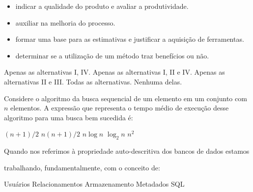 \documentclass[12pt, addpoints]{exam}
\begin{document}
\begin{questions}
\begin{itemize}

    \item[I)] indicar a qualidade do produto e avaliar a produtividade.

    \item[II)] auxiliar na melhoria do processo.

    \item[III)] formar uma base para as estimativas e justificar a aquisição de ferramentas.

    \item[IV)] determinar se a utilização de um método traz benefícios ou não.

\end{itemize}
\begin{choices}
\choice Apenas as alternativas I, IV.
\choice Apenas as alternativas I, II e IV.
\choice Apenas as alternativas II e III.
\choice Todas as alternativas.
\choice Nenhuma delas.
\end{choices}

\question

Considere o algoritmo da busca sequencial de um elemento em um conjunto com \( n \) elementos. A expressão que representa o tempo médio de execução desse algoritmo para uma busca bem sucedida é:
\begin{choices}
\choice \( (n + 1)/2 \)
\choice \( n(n + 1)/2 \)
\choice \( n \log n \)
\choice \( \log_2 n \)
\choice \( n^2 \)
\end{choices}

\question

Quando nos referimos à propriedade auto-descritiva dos bancos de dados estamos

trabalhando, fundamentalmente, com o conceito de:
\begin{choices}
\choice Usuários
\choice Relacionamentos
\choice Armazenamento
\choice Metadados
\choice SQL
\end{choices}



    \end{questions}
    
\end{document}
